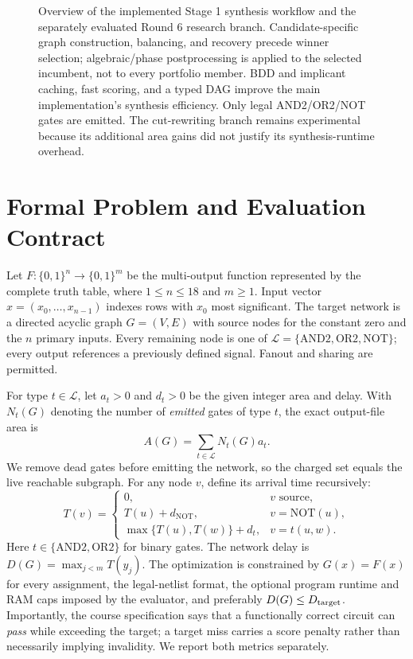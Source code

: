 \documentclass[journal,10pt]{IEEEtran}
\newcommand{\AND}{\mathrm{AND2}}
\newcommand{\OR}{\mathrm{OR2}}
\newcommand{\NOT}{\mathrm{NOT}}
\newcommand{\Lset}{\mathcal{L}}
\begin{document}
\begin{figure}[!t]
\centering

\caption{Overview of the implemented Stage 1 synthesis workflow and the separately evaluated Round 6 research branch. Candidate-specific graph construction, balancing, and recovery precede winner selection; algebraic/phase postprocessing is applied to the selected incumbent, not to every portfolio member. BDD and implicant caching, fast scoring, and a typed DAG improve the main implementation's synthesis efficiency. Only legal AND2/OR2/NOT gates are emitted. The cut-rewriting branch remains experimental because its additional area gains did not justify its synthesis-runtime overhead.}
\label{fig:workflow}
\end{figure}

\section{Formal Problem and Evaluation Contract}
Let $F:\{0,1\}^{n}\rightarrow\{0,1\}^{m}$ be the multi-output function represented by the complete truth table, where $1\le n\le18$ and $m\ge1$. Input vector $x=(x_0,\ldots,x_{n-1})$ indexes rows with $x_0$ most significant. The target network is a directed acyclic graph $G=(V,E)$ with source nodes for the constant zero and the $n$ primary inputs. Every remaining node is one of $\Lset=\{\AND,\OR,\NOT\}$; every output references a previously defined signal. Fanout and sharing are permitted.

For type $t\in\Lset$, let $a_t>0$ and $d_t>0$ be the given integer area and delay. With $N_t(G)$ denoting the number of \emph{emitted} gates of type $t$, the exact output-file area is
\begin{equation}\label{eq:area}
 A(G)=\sum_{t\in\Lset}N_t(G)a_t.
\end{equation}
We remove dead gates before emitting the network, so the charged set equals the live reachable subgraph. For any node $v$, define its arrival time recursively:
\begin{equation}\label{eq:arrival}
 T(v)=\begin{cases}
 0, &v\text{ source},\\
 T(u)+d_{\NOT}, &v=\NOT(u),\\
 \max\{T(u),T(w)\}+d_t, &v=t(u,w).
 \end{cases}
\end{equation}
Here $t\in\{\AND,\OR\}$ for binary gates. The network delay is $D(G)=\max_{j<m}T(y_j)$. The optimization is constrained by $G(x)=F(x)$ for every assignment, the legal-netlist format, the optional program runtime and RAM caps imposed by the evaluator, and preferably $D(G)\le D_{\rm target}$. Importantly, the course specification says that a functionally correct circuit can \emph{pass} while exceeding the target; a target miss carries a score penalty rather than necessarily implying invalidity. We report both metrics separately.
\end{document}
